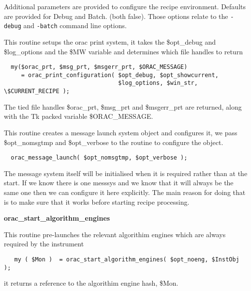 \begin{description}
Additional parameters are provided to configure the recipe
environment. Defaults are provided for Debug and Batch.
(both false). Those options relate to the \texttt{-debug} and \texttt{-batch}
command line options.

\item[\textbf{orac\_print\_configuration}] \mbox{}

This routine setups the orac print system, it takes the \$opt\_debug and
\$log\_options and the \$MW variable and determines which file handles to return

\begin{verbatim}
  my($orac_prt, $msg_prt, $msgerr_prt, $ORAC_MESSAGE)    
     = orac_print_configuration( $opt_debug, $opt_showcurrent,
                                 $log_options, $win_str, \$CURRENT_RECIPE );
\end{verbatim}


The tied file handles \$orac\_prt, \$msg\_prt and \$msgerr\_prt are returned, along with the Tk packed variable \$ORAC\_MESSAGE.

\item[\textbf{orac\_message\_launch}] \mbox{}

This routine creates a message launch system object and configures it,
we pass \$opt\_nomsgtmp and \$opt\_verbose to the routine to configure the
object.

\begin{verbatim}
  orac_message_launch( $opt_nomsgtmp, $opt_verbose );
\end{verbatim}


The message system itself will be initialised when it is required 
rather than at the start. If we know there is one messsys and we 
know that it will always be the same one then we can configure it here explicitly. The main reason for doing that is to make sure that it 
works before starting recipe processing.

\item \textbf{\textbf{orac\_start\_algorithm\_engines}}

This routine pre-launches the relevant algorithim engines which are always required by the instrument

\begin{verbatim}
   my ( $Mon )  = orac_start_algorithm_engines( $opt_noeng, $InstObj );
\end{verbatim}


it returns a reference to the algorithim engine hash, \$Mon.

\item[\textbf{orac\_start\_display}] \mbox{}


\end{description}
